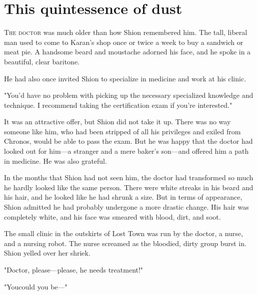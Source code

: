
\chapter{This quintessence of dust}


\lettrine{T}{he doctor} was much older than how Shion remembered him. The tall,
liberal man used to come to Karan's shop once or twice a week to buy a
sandwich or meat pie. A handsome beard and moustache adorned his face,
and he spoke in a beautiful, clear baritone.

He had also once invited Shion to specialize in medicine and work at his
clinic.

"You'd have no problem with picking up the necessary specialized
knowledge and technique. I recommend taking the certification exam if
you're interested."

It was an attractive offer, but Shion did not take it up. There was no
way someone like him, who had been stripped of all his privileges and
exiled from Chronos, would be able to pass the exam. But he was happy
that the doctor had looked out for him---a stranger and a mere baker's
son---and offered him a path in medicine. He was also grateful.

In the months that Shion had not seen him, the doctor had transformed so
much he hardly looked like the same person. There were white streaks in
his beard and his hair, and he looked like he had shrunk a size. But in
terms of appearance, Shion admitted he had probably undergone a more
drastic change. His hair was completely white, and his face was smeared
with blood, dirt, and soot.

The small clinic in the outskirts of Lost Town was run by the doctor, a
nurse, and a nursing robot. The nurse screamed as the bloodied, dirty
group burst in. Shion yelled over her shriek.

"Doctor, please---please, he needs treatment!"

"You\el could you be---"

